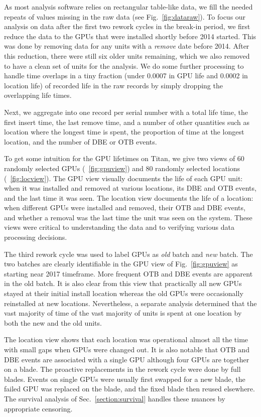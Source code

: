 As most analysis software relies on rectangular table-like data, we
fill the needed repeats of values missing in the raw data (see
Fig.~\ref{fig:dataraw}). To focus our analysis on data after the first
two rework cycles in the break-in period, we first reduce the data to
the GPUs that were installed shortly before 2014 started. This was
done by removing data for any units with a {\em remove} date before
2014. After this reduction, there were still six older units
remaining, which we also removed to have a clean set of units for the
analysis. We do some further processing to handle time overlaps in a
tiny fraction (under 0.0007 in GPU life and 0.0002 in location life)
of recorded life in the raw records by simply dropping the overlapping
life times. 

Next, we aggregate into one record per serial number with a total life
time, the first insert time, the last remove time, and a number of
other quantities such as location where the longest time is spent, the
proportion of time at the longest location, and the number of DBE or
OTB events.

To get some intuition for the GPU lifetimes on Titan, we give two
views of 60 randomly selected GPUs (~\ref{fig:gpuview}) and 80
randomly selected locations (~\ref{fig:locview}).
The GPU view
visually documents the life of each GPU unit: when it was installed and
removed at various locations, its DBE and OTB events, and the last
time it was seen. The location view documents the life of a location:
when different GPUs were installed and removed, their OTB and DBE
events, and whether a removal was the last time the unit was seen on
the system. These views were critical to understanding the data and to
verifying various data processing decisions.

The third rework cycle was used to label GPUs as {\em old} batch and
{\em new} batch. The two batches are clearly identifiable in the GPU
view of Fig.~\ref{fig:gpuview} as starting near 2017 timeframe. More
frequent OTB and DBE events are apparent in the old batch. It is also
clear from this view that practically all new GPUs stayed at their
initial install location whereas the old GPUs were occasionally
reinstalled at new locations. Nevertheless, a separate analysis
determined that the vast majority of time of the vast majority of
units is spent at one location by both the new and the old units.

The location view shows that each location was operational almost all
the time with small gaps when GPUs were changed out. It is also
notable that OTB and DBE events are associated with a single GPU
although four GPUs are together on a blade. The proactive replacements
in the rework cycle were done by full blades. Events on single GPUs
were usually first swapped for a new blade, the failed GPU was
replaced on the blade, and the fixed blade then reused elsewhere. The
survival analysis of Sec.~\ref{section:survival} handles these nuances
by appropriate censoring.
